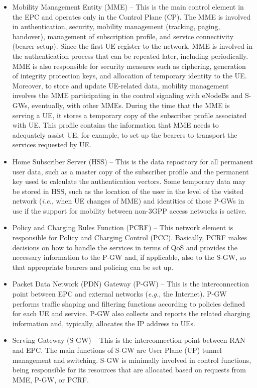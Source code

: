 \begin{itemize}
\item Mobility Management Entity (MME) -- This is the main control element in the EPC and operates only in the Control Plane (CP). The MME is involved in authentication, security, mobility management (tracking, paging, handover), management of subscription profile, and service connectivity (bearer setup). Since the first UE register to the network, MME is involved in the authentication process that can be repeated later, including periodically. MME is also responsible for security measures such as ciphering, generation of integrity protection keys, and allocation of temporary identity to the UE. Moreover, to store and update UE-related data, mobility management involves the MME participating in the control signaling with eNodeBs and S-GWs, eventually, with other MMEs. During the time that the MME is serving a UE, it stores a temporary copy of the subscriber profile associated with UE. This profile contains the information that MME needs to adequately assist UE, for example, to set up the bearers to transport the services requested by UE.

\item Home Subscriber Server (HSS) -- This is the data repository for all permanent user data, such as a master copy of the subscriber profile and the permanent key used to calculate the authentication vectors. Some temporary data may be stored in HSS, such as the location of the user in the level of the visited network (\textit{i.e.}, when UE changes of MME) and identities of those P-GWs in use if the support for mobility between non-3GPP access networks is active.

\item Policy and Charging Rules Function (PCRF) -- This network element is responsible for Policy and Charging Control (PCC). Basically, PCRF makes decisions on how to handle the services in terms of QoS and provides the necessary information to the P-GW and, if applicable, also to the S-GW, so that appropriate bearers and policing can be set up.

\item Packet Data Network (PDN) Gateway (P-GW) -- This is the interconnection point between EPC and external networks (\textit{e.g.}, the Internet). P-GW performs traffic shaping and filtering functions according to policies defined for each UE and service. P-GW also collects and reports the related charging information and, typically, allocates the IP address to UEs.

\item Serving Gateway (S-GW) -- This is the interconnection point between RAN and EPC. The main functions of S-GW are User Plane (UP) tunnel management and switching. S-GW is minimally involved in control functions, being responsible for its resources that are allocated based on requests from MME, P-GW, or PCRF.
\end{itemize}